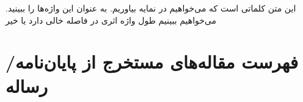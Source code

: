 \documentclass[msc]{AlzahraThesis}
\begin{document}
\begin{spacing}{1.5}

\tableofcontents
\IncludeNotationPage{

}

\listoftables
\newpage
\listoffigures
\newpage
\end{spacing}


\pagestyle{fancy}
\IncludePrefacePage{

}



این متن 
کلماتی است که می‌خواهیم در نمایه بیاوریم. به عنوان
این واژه‌ها را ببینید.
می‌خواهیم ببینیم طول واژه اثری در فاصله
 خالی دارد یا خیر

%
%

%




\pagestyle{empty}

\appendixMode








\newpage
\section*{فهرست مقاله‌های مستخرج از پایان‌نامه/رساله}
\end{document}
